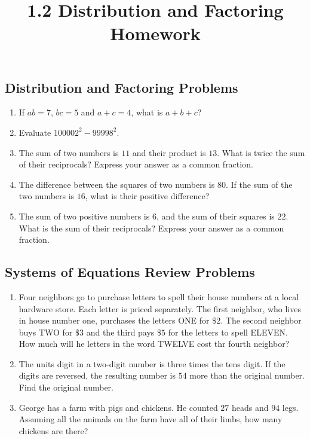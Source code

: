 \documentclass{article}
\title{1.2 Distribution and Factoring Homework}
\author{}
\date{}
\begin{document}
\maketitle

\subsection*{Distribution and Factoring Problems}
\begin{enumerate}
    \item If $ab = 7$, $bc = 5$ and $a + c = 4$, what is $a + b + c$?
    \vspace{3cm}
    \item Evaluate $100002^2 - 99998^2$.
    \vspace{3cm}
    \item The sum of two numbers is $11$ and their product is $13$. What
    is twice the sum of their reciprocals? Express your answer as a
    common fraction.
    \vspace{3cm}
    \item The difference between the squares of two numbers is $80$. If the
    sum of the two numbers is $16$, what is their positive difference?
    \vspace{3cm}
    \item The sum of two positive numbers is $6$, and the sum of their
    squares is $22$. What is the sum of their reciprocals? Express your
    answer as a common fraction.
\end{enumerate}

\newpage

\subsection*{Systems of Equations Review Problems}
\begin{enumerate}[resume]
    \item Four neighbors go to purchase letters to spell their house numbers
    at a local hardware store. Each letter is priced separately. The first
    neighbor, who lives in house number one, purchases the letters ONE for
    $\$2$. The second neighbor buys TWO for $\$3$ and the third pays $\$5$
    for the letters to spell ELEVEN. How much will he letters in the word
    TWELVE cost thr fourth neighbor?
    \vspace{3cm}
    \item The units digit in a two-digit number is three times the tens
    digit. If the digits are reversed, the resulting number is $54$ more
    than the original number. Find the original number.
    \vspace{3cm}
    \item George has a farm with pigs and chickens. He counted $27$ heads
    and $94$ legs. Assuming all the animals on the farm have all of their
    limbs, how many chickens are there?
    \vspace{3cm}
\end{enumerate}
\end{document}
